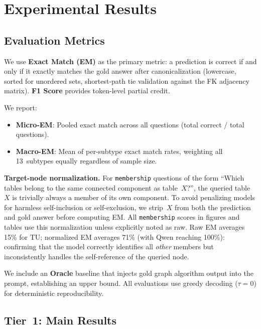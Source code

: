 \section{Experimental Results}
\label{sec:experiments}

\subsection{Evaluation Metrics}

We use \textbf{Exact Match (EM)} as the primary metric: a prediction is
correct if and only if it exactly matches the gold answer after
canonicalization (lowercase, sorted for unordered sets, shortest-path
tie validation against the FK adjacency matrix).
\textbf{F1 Score} provides token-level partial credit.

We report:
\begin{itemize}
  \item \textbf{Micro-EM}: Pooled exact match across all questions
    (total correct / total questions).
  \item \textbf{Macro-EM}: Mean of per-subtype exact match rates,
    weighting all 13~subtypes equally regardless of sample size.
\end{itemize}

\textbf{Target-node normalization.}
For \texttt{membership} questions of the form
``Which tables belong to the same connected component as table~$X$?'',
the queried table~$X$ is trivially always a member of its own component.
To avoid penalizing models for harmless self-inclusion or self-exclusion,
we strip~$X$ from both the prediction and gold answer before computing EM.
All \texttt{membership} scores in figures and tables use this normalization
unless explicitly noted as raw.  Raw EM averages 15\% for TU;
normalized EM averages 71\% (with Qwen reaching 100\%): confirming
that the model correctly identifies all \emph{other} members but
inconsistently handles the self-reference of the queried node.

We include an \textbf{Oracle} baseline that injects gold graph algorithm
output into the prompt, establishing an upper bound.  All evaluations
use greedy decoding ($\tau{=}0$) for deterministic reproducibility.

\subsection{Tier~1: Main Results}

